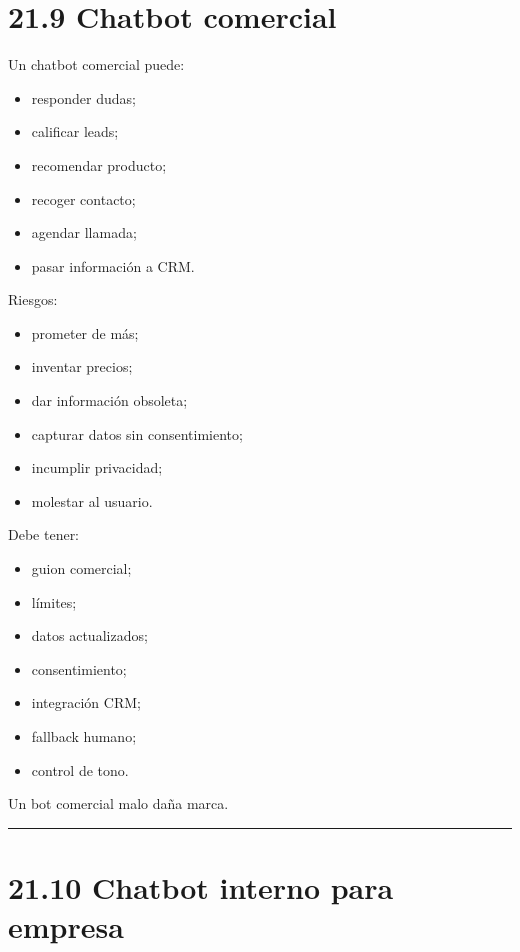 \section{21.9 Chatbot comercial}\label{chatbot-comercial-1}

Un chatbot comercial puede:

\begin{itemize}
\tightlist
\item
  responder dudas;
\item
  calificar leads;
\item
  recomendar producto;
\item
  recoger contacto;
\item
  agendar llamada;
\item
  pasar información a CRM.
\end{itemize}

Riesgos:

\begin{itemize}
\tightlist
\item
  prometer de más;
\item
  inventar precios;
\item
  dar información obsoleta;
\item
  capturar datos sin consentimiento;
\item
  incumplir privacidad;
\item
  molestar al usuario.
\end{itemize}

Debe tener:

\begin{itemize}
\tightlist
\item
  guion comercial;
\item
  límites;
\item
  datos actualizados;
\item
  consentimiento;
\item
  integración CRM;
\item
  fallback humano;
\item
  control de tono.
\end{itemize}

Un bot comercial malo daña marca.

\begin{center}\rule{0.5\linewidth}{0.5pt}\end{center}

\section{21.10 Chatbot interno para
empresa}\label{chatbot-interno-para-empresa}

